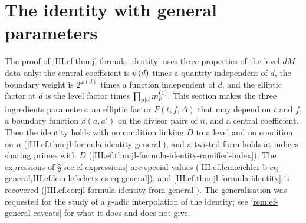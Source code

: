 \section{The identity with general parameters}\label{sec:ef-identity-general}

The proof of \cref{III.ef.thm:jl-formula-identity} uses three properties of the level-$dM$ data only: the central coefficient is $\psi(d)$ times
a quantity independent of $d$, the boundary weight is $2^{\omega(d)}$ times a function independent of $d$, and the elliptic factor at $d$ is the
level factor times $\prod_{p\mid d}m^{(1)}_p$. This section makes the three ingredients parameters: an elliptic factor $F(t,f,\Delta)$ that may
depend on $t$ and $f$, a boundary function $\beta(a,a')$ on the divisor pairs of $n$, and a central coefficient. Then the identity holds with no
condition linking $D$ to a level and no condition on $n$ (\cref{III.ef.thm:jl-formula-identity-general}), and a twisted form holds at indices
sharing primes with $D$ (\cref{III.ef.thm:jl-formula-identity-ramified-index}). The expressions of \S\ref{sec:ef-expressions} are special values
(\cref{III.ef.lem:eichler-b-eq-general,III.ef.lem:lefschetz-es-eq-general}), and \cref{III.ef.thm:jl-formula-identity} is recovered
(\cref{III.ef.cor:jl-formula-identity-from-general}). The generalisation was requested for the study of a $p$-adic interpolation of the identity; see
\cref{rem:ef-general-caveats} for what it does and does not give.

\begin{definition}
\end{definition}

\begin{definition}
\end{definition}

\begin{definition}
\end{definition}

